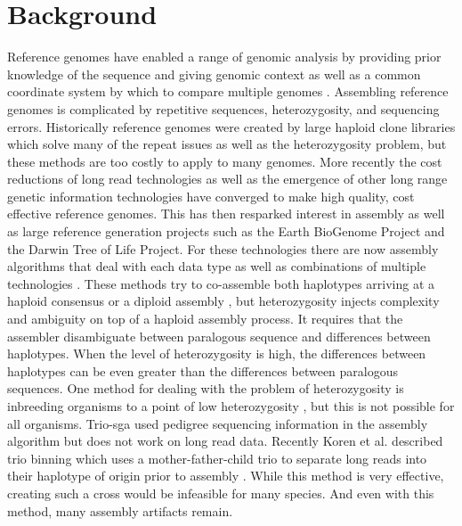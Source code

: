 \section{Background}
Reference genomes have enabled a range of genomic analysis by providing prior knowledge of the sequence 
and giving genomic context as well as a common coordinate system by which to compare multiple genomes \cite{1000genomes} \cite{GRCh38}.
Assembling reference genomes is complicated by repetitive sequences, heterozygosity, and sequencing errors. 
Historically reference genomes were created by large haploid clone libraries \cite{human} 
which solve many of the repeat issues as well as the heterozygosity problem, but these methods are too costly to 
apply to many genomes. More recently the cost reductions of long read technologies \cite{pacbio} \cite{oxford} 
as well as the emergence of other long range genetic information technologies \cite{10xlinked} \cite{HiC} \cite{bionano} 
have converged to make high quality, cost effective reference genomes. This has then resparked interest in assembly 
as well as large reference generation projects such as the Earth BioGenome Project \cite{EBGP} and the Darwin Tree of Life Project.
For these technologies there are now assembly algorithms that deal with each data type \cite{falcon} \cite{supernova} \cite{bionano_assembly} 
as well as combinations of multiple technologies \cite{genemyers} \cite{hybrid10x} \cite{aedes}. 
 These methods try to co-assemble both haplotypes arriving at a haploid consensus \cite{watchtower} \cite{canu} 
 or a diploid assembly \cite{falconPHASE} \cite{supernova}, but heterozygosity injects complexity and ambiguity on top of a haploid assembly process.
 It requires that the assembler disambiguate between paralogous sequence and differences between haplotypes. When 
 the level of heterozygosity is high, the differences between haplotypes can be even greater than the differences between paralogous 
 sequences. One method for dealing with the problem of heterozygosity is inbreeding organisms to a point of low heterozygosity \cite{drosophila}, 
but this is not possible for all organisms. Trio-sga used pedigree sequencing information in the assembly algorithm \cite{trio-sga} 
but does not work on long read data. Recently Koren et al. described trio binning which uses a mother-father-child trio to 
separate long reads into their haplotype of origin prior to assembly \cite{triobinning}. 
While this method is very effective, creating such a cross would be infeasible for many species. 
And even with this method, many assembly artifacts remain.



